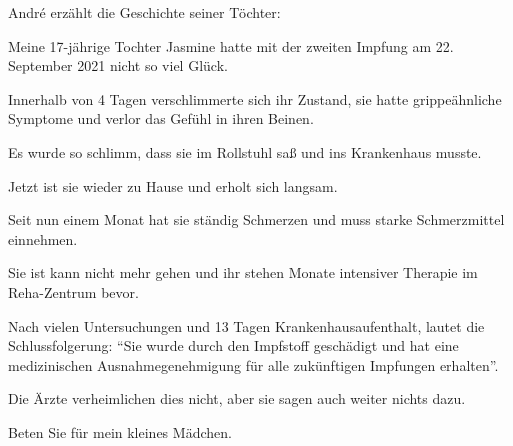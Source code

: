 André erzählt die Geschichte seiner Töchter:

Meine 17-jährige Tochter Jasmine hatte mit der zweiten Impfung am 22. September
2021 nicht so viel Glück.

Innerhalb von 4 Tagen verschlimmerte sich ihr Zustand, sie hatte grippeähnliche
Symptome und verlor das Gefühl in ihren Beinen.

Es wurde so schlimm, dass sie im Rollstuhl saß und ins Krankenhaus musste.

Jetzt ist sie wieder zu Hause und erholt sich langsam.

Seit nun einem Monat hat sie ständig Schmerzen und muss starke Schmerzmittel
einnehmen.

Sie ist kann nicht mehr gehen und ihr stehen Monate intensiver Therapie im
Reha-Zentrum bevor.

Nach vielen Untersuchungen und 13 Tagen Krankenhausaufenthalt, lautet die
Schlussfolgerung: ``Sie wurde durch den Impfstoff geschädigt und hat eine
medizinischen Ausnahmegenehmigung für alle zukünftigen Impfungen erhalten''.

Die Ärzte verheimlichen dies nicht, aber sie sagen auch weiter nichts dazu.

Beten Sie für mein kleines Mädchen.
